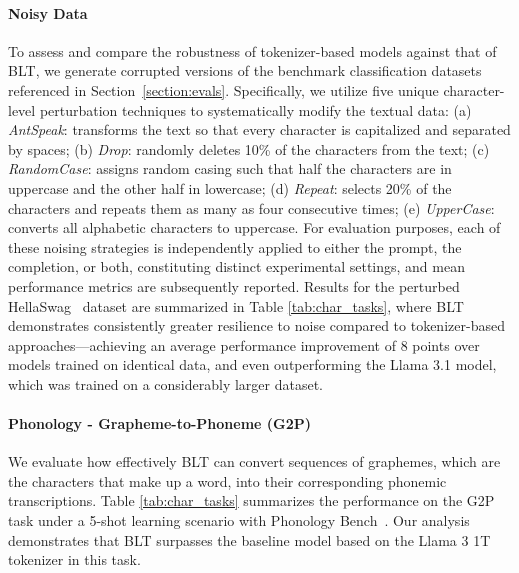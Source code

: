 \paragraph{Noisy Data} To assess and compare the robustness of tokenizer-based models against that of {\textsc BLT}, we generate corrupted versions of the benchmark classification datasets referenced in Section~\ref{section:evals}. Specifically, we utilize five unique character-level perturbation techniques to systematically modify the textual data: (a) \textit{AntSpeak}: transforms the text so that every character is capitalized and separated by spaces; (b) \textit{Drop}: randomly deletes 10\% of the characters from the text; (c) \textit{RandomCase}: assigns random casing such that half the characters are in uppercase and the other half in lowercase; (d) \textit{Repeat}: selects 20\% of the characters and repeats them as many as four consecutive times; (e) \textit{UpperCase}: converts all alphabetic characters to uppercase. For evaluation purposes, each of these noising strategies is independently applied to either the prompt, the completion, or both, constituting distinct experimental settings, and mean performance metrics are subsequently reported. Results for the perturbed HellaSwag~\citep{Eval_hellaswag} dataset are summarized in Table \ref{tab:char_tasks}, where {\textsc BLT} demonstrates consistently greater resilience to noise compared to tokenizer-based approaches—achieving an average performance improvement of 8 points over models trained on identical data, and even outperforming the Llama 3.1 model, which was trained on a considerably larger dataset.

\paragraph{Phonology - Grapheme-to-Phoneme (G2P)} We evaluate how effectively {\textsc BLT} can convert sequences of graphemes, which are the characters that make up a word, into their corresponding phonemic transcriptions. Table \ref{tab:char_tasks} summarizes the performance on the G2P task under a 5-shot learning scenario with Phonology Bench~\citep{suvarna2024phonologybench}. Our analysis demonstrates that {\textsc BLT} surpasses the baseline model based on the Llama 3 1T tokenizer in this task.


